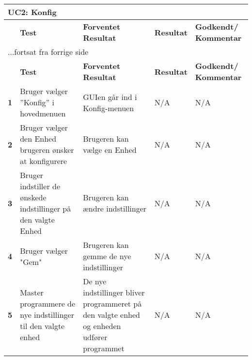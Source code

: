 \begin{center}
\begin{longtable}{|p{}|p{}|p{}|p{}|p{}|} %
\hline
\multicolumn{5}{|l|}{\textbf{UC2: Konfig}} \\ \hline
\multicolumn{1}{|c|}{} &
\textbf{Test} &
\textbf{Forventet \newline Resultat} &
\textbf{Resultat} &
\textbf{Godkendt/ \newline Kommentar} \\ \hline 
\endfirsthead

\multicolumn{5}{l}{...fortsat fra forrige side} \\ \hline 
\multicolumn{1}{|c|}{} &
\textbf{Test} &
\textbf{Forventet \newline Resultat} &
\textbf{Resultat} &
\textbf{Godkendt/ \newline Kommentar} \\ \hline 
\endhead

\textbf{1}	&Bruger vælger ''Konfig'' i hovedmenuen
			&GUIen går ind i Konfig-menuen 
			&N/A 
			&N/A \\ \hline 
			
\textbf{2}	&Bruger vælger den Enhed brugeren ønsker at konfigurere
			&Brugeren kan vælge en Enhed
			&N/A
			&N/A \\ \hline 
			
\textbf{3}	&Bruger indstiller de ønskede indstillinger på den valgte Enhed
			&Brugeren kan ændre indstillinger
			&N/A
			&N/A \\ \hline 
			
\textbf{4}	&Bruger vælger "Gem" 
			&Brugeren kan gemme de nye indstillinger
			&N/A
			&N/A \\ \hline 
			
\textbf{5}	&Master programmere de nye indstillinger til den valgte enhed
			&De nye indstillinger bliver programmeret på den valgte enhed og enheden udfører programmet
			&N/A
			&N/A \\ \hline 
			
\end{longtable}
	\label{ATUC2} 
\end{center}